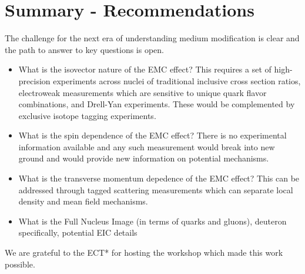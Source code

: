 \section{Summary - Recommendations}

The challenge for the next era of understanding medium modification is clear and the path to answer to key questions is open. 
\begin{itemize}
\item What is the isovector nature of the EMC effect?  This requires a set of high-precision experiments across nuclei of traditional inclusive cross section ratios, electroweak measurements which are sensitive to unique quark flavor combinations, and Drell-Yan experiments.  These would be complemented by exclusive isotope tagging experiments. 
\item What is the spin dependence of the EMC effect?  There is no experimental information available and any such measurement would break into new ground and would provide new information on potential mechanisms.
\item What is the transverse momentum depedence of the EMC effect?  This can be addressed through tagged scattering measurements which can separate local density and mean field mechanisms.   

\item What is the Full Nucleus Image (in terms of quarks and gluons), deuteron specifically, potential EIC details
\end{itemize}

We are grateful to the ECT* for hosting the workshop which made this work possible.
